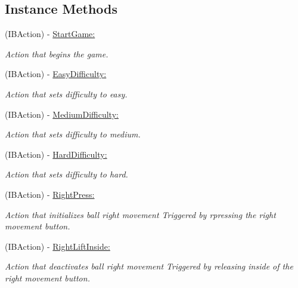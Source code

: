 \subsection*{Instance Methods}
\begin{DoxyCompactItemize}
\item 
(I\+B\+Action) -\/ \hyperlink{interface_game_a76f9ded0ae00bb71a0d4537b63e0a037}{Start\+Game\+:}
\begin{DoxyCompactList}\small\item\em Action that begins the game. \end{DoxyCompactList}\item 
(I\+B\+Action) -\/ \hyperlink{interface_game_a5282ada4b519d6f40b0336f01f9763b9}{Easy\+Difficulty\+:}
\begin{DoxyCompactList}\small\item\em Action that sets difficulty to easy. \end{DoxyCompactList}\item 
(I\+B\+Action) -\/ \hyperlink{interface_game_a5e4cedf99a9de2a204e9bc79dcfd3ce7}{Medium\+Difficulty\+:}
\begin{DoxyCompactList}\small\item\em Action that sets difficulty to medium. \end{DoxyCompactList}\item 
(I\+B\+Action) -\/ \hyperlink{interface_game_afb1de927fac817db6ee4690f95f1e190}{Hard\+Difficulty\+:}
\begin{DoxyCompactList}\small\item\em Action that sets difficulty to hard. \end{DoxyCompactList}\item 
(I\+B\+Action) -\/ \hyperlink{interface_game_a6541a38a55ee81db37b38797431efc6d}{Right\+Press\+:}
\begin{DoxyCompactList}\small\item\em Action that initializes ball right movement Triggered by rpressing the right movement button. \end{DoxyCompactList}\item 
(I\+B\+Action) -\/ \hyperlink{interface_game_ae7f6c4d2f13a755392735378117bd86a}{Right\+Lift\+Inside\+:}
\begin{DoxyCompactList}\small\item\em Action that deactivates ball right movement Triggered by releasing inside of the right movement button. \end{DoxyCompactList}\item 

\end{DoxyCompactItemize}
